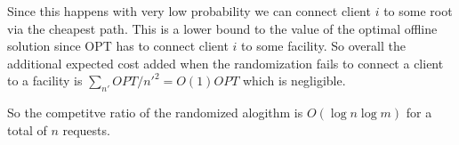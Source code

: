Since this happens with very low probability we can connect client $i$ to some root via the cheapest path. This is a lower bound to the value of the optimal offline solution since OPT has to connect client $i$ to some facility. So overall the additional expected cost added when the randomization fails to connect a client to a facility is $\sum_{n'} OPT/n'^2 = O(1) OPT$ which is negligible.

So the competitve ratio of the randomized alogithm is $O(\log n \log m)$ for a total of $n$ requests.

~\cite{naor11:node-weighted-steiner-tree}